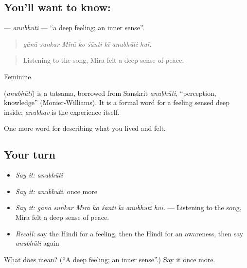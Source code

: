 \subsection*{You'll want to know: }
\textbf{} — \emph{anubhūti} — \textquotedblleft{}a deep feeling; an inner sense\textquotedblright{}.

\begin{quote}
       
\end{quote}

\begin{quote}
\emph{gānā sunkar Mīrā ko śānti kī anubhūti huī.}
\end{quote}

\begin{quote}
Listening to the song, Mira felt a deep sense of peace.
\end{quote}

Feminine.

\begin{cousinweb}
\textbf{} (\emph{anubhūti}) is a tatsama, borrowed from Sanskrit \emph{anubhūti}, \textquotedblleft{}perception, knowledge\textquotedblright{} (Monier-Williams). It is a formal word for a feeling sensed deep inside; \emph{anubhav} is the experience itself.
\end{cousinweb}

\begin{grammarlens}[title={What you've built}]
One more word for describing what you lived and felt.
\end{grammarlens}

\subsection*{Your turn}
\begin{itemize}
\raggedright
  \item \emph{Say it:} \emph{anubhūti}
  \item \emph{Say it:} \emph{anubhūti}, once more
  \item \emph{Say it:} \emph{gānā sunkar Mīrā ko śānti kī anubhūti huī.} — Listening to the song, Mira felt a deep sense of peace.
  \item \emph{Recall:} say the Hindi for a feeling, then the Hindi for an awareness, then say \emph{anubhūti} again
\end{itemize}

\begin{tcolorbox}[breakable,colback=teal!4,colframe=teal!35!black,title={Before you move on}]
What does  mean? (\textquotedblleft{}A deep feeling; an inner sense\textquotedblright{}.) Say it once more.
\end{tcolorbox}
